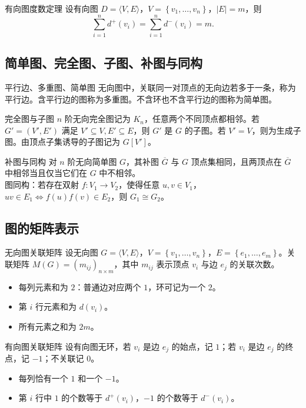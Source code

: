 \documentclass[UTF8,zihao=-4]{ctexart}
\newcommand{\set}[1]{\left\{#1\right\}}
\begin{document}
\begin{corebox}{有向图度数定理}
设有向图 $D=\langle V,E\rangle$，$V=\set{v_1,\ldots,v_n}$，$|E|=m$，则
\[
\sum_{i=1}^n d^+(v_i)=\sum_{i=1}^n d^-(v_i)=m.
\]
\end{corebox}

\subsection{简单图、完全图、子图、补图与同构}

\begin{corebox}{平行边、多重图、简单图}
无向图中，关联同一对顶点的无向边若多于一条，称为平行边。含平行边的图称为多重图。不含环也不含平行边的图称为简单图。
\end{corebox}

\begin{corebox}{完全图与子图}
$n$ 阶无向完全图记为 $K_n$，任意两个不同顶点都相邻。若 $G'=(V',E')$ 满足 $V'\subseteq V,E'\subseteq E$，则 $G'$ 是 $G$ 的子图。若 $V'=V$，则为生成子图。由顶点子集诱导的子图记为 $G[V']$。
\end{corebox}

\begin{corebox}{补图与同构}
对 $n$ 阶无向简单图 $G$，其补图 $\overline G$ 与 $G$ 顶点集相同，且两顶点在 $\overline G$ 中相邻当且仅当它们在 $G$ 中不相邻。\\
图同构：若存在双射 $f:V_1\to V_2$，使得任意 $u,v\in V_1$，$uv\in E_1\Leftrightarrow f(u)f(v)\in E_2$，则 $G_1\cong G_2$。
\end{corebox}

\subsection{图的矩阵表示}

\begin{corebox}{无向图关联矩阵}
设无向图 $G=\langle V,E\rangle$，$V=\set{v_1,\ldots,v_n}$，$E=\set{e_1,\ldots,e_m}$。关联矩阵 $M(G)=(m_{ij})_{n\times m}$，其中 $m_{ij}$ 表示顶点 $v_i$ 与边 $e_j$ 的关联次数。
\begin{itemize}
  \item 每列元素和为 $2$：普通边对应两个 $1$，环可记为一个 $2$。
  \item 第 $i$ 行元素和为 $d(v_i)$。
  \item 所有元素之和为 $2m$。
\end{itemize}
\end{corebox}

\begin{corebox}{有向图关联矩阵}
设有向图无环，若 $v_i$ 是边 $e_j$ 的始点，记 $1$；若 $v_i$ 是边 $e_j$ 的终点，记 $-1$；不关联记 $0$。
\begin{itemize}
  \item 每列恰有一个 $1$ 和一个 $-1$。
  \item 第 $i$ 行中 $1$ 的个数等于 $d^+(v_i)$，$-1$ 的个数等于 $d^-(v_i)$。
\end{itemize}
\end{corebox}
\end{document}
